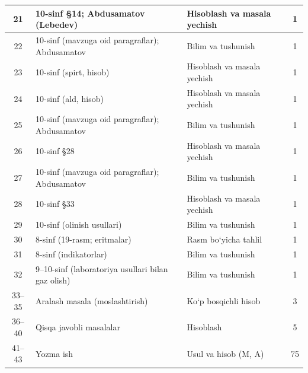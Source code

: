 \documentclass[11pt,a4paper]{article}
\begin{document}
{\begin{longtable}{|c|p{7.2cm}|p{5.4cm}|c|}
21 & 10-sinf \S{}14; Abdusamatov (Lebedev) & Hisoblash va masala yechish & 1\\\hline
22 & 10-sinf (mavzuga oid paragraflar); Abdusamatov & Bilim va tushunish & 1\\\hline
23 & 10-sinf (spirt, hisob) & Hisoblash va masala yechish & 1\\\hline
24 & 10-sinf (ald, hisob) & Hisoblash va masala yechish & 1\\\hline
25 & 10-sinf (mavzuga oid paragraflar); Abdusamatov & Bilim va tushunish & 1\\\hline
26 & 10-sinf \S{}28 & Hisoblash va masala yechish & 1\\\hline
27 & 10-sinf (mavzuga oid paragraflar); Abdusamatov & Bilim va tushunish & 1\\\hline
28 & 10-sinf \S{}33 & Hisoblash va masala yechish & 1\\\hline
29 & 10-sinf (olinish usullari) & Bilim va tushunish & 1\\\hline
30 & 8-sinf (19-rasm; eritmalar) & Rasm bo`yicha tahlil & 1\\\hline
31 & 8-sinf (indikatorlar) & Bilim va tushunish & 1\\\hline
32 & 9--10-sinf (laboratoriya usullari bilan gaz olish) & Bilim va tushunish & 1\\\hline
33--35 & Aralash masala (moslashtirish) & Ko`p bosqichli hisob & 3\\\hline
36--40 & Qisqa javobli masalalar & Hisoblash & 5\\\hline
41--43 & Yozma ish & Usul va hisob (M, A) & 75\\\hline
\end{longtable}}
\end{document}

